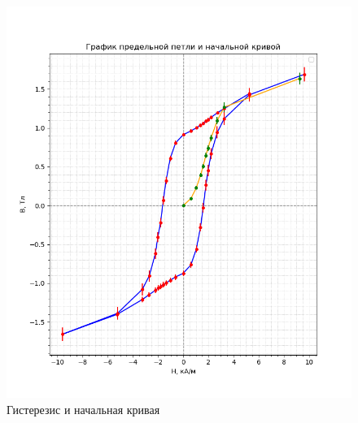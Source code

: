 \documentclass[a4paper, 12pt]{article}
\begin{document}
\begin{figure}[ht]
\begin{minipage}[b]{0.45\linewidth}
        \includegraphics[width=1.1\linewidth]{fig2_with_inital_curve_and_errors.png}
        \caption{Гистерезис и начальная кривая}
        \label{fig:graph2}
    \end{minipage}
    \label{fig:graphs}
\end{figure}
\end{document}

